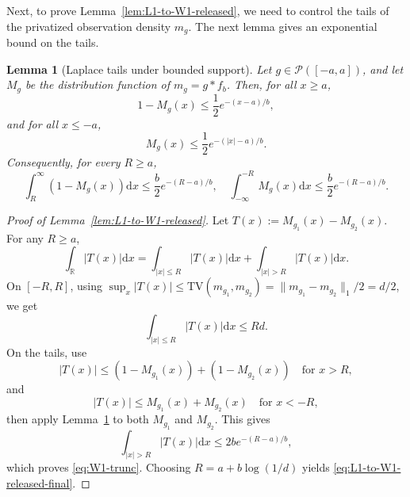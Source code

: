 \documentclass[english, 11pt]{article}
\newcommand{\mrd}{\mathrm{d}}
\theoremstyle{plain}
\newtheorem{lemma}[theorem]{Lemma}
\theoremstyle{definition}
\theoremstyle{remark}
\begin{document}
\begin{appendix}
Next, to prove Lemma~\ref{lem:L1-to-W1-released}, we need to control the tails of the privatized observation density $m_g$. The next lemma gives an exponential bound on the tails.

\begin{lemma}[Laplace tails under bounded support]\label{lem:laplace-tail}
Let $g\in\mathcal P([-a,a])$, and let $M_g$ be the distribution function of $m_g=g*f_b$. Then, for all $x\ge a$,
\begin{equation}\label{eq:right-tail}
1-M_g(x)\le \frac12 e^{-(x-a)/b},
\end{equation}
and for all $x\le -a$,
\begin{equation}\label{eq:left-tail}
M_g(x)\le \frac12 e^{-(|x|-a)/b}.
\end{equation}
Consequently, for every $R\ge a$,
\begin{equation}\label{eq:tail-int}
\int_R^\infty (1-M_g(x))\mrd x \le \frac{b}{2}e^{-(R-a)/b}, \quad \int_{-\infty}^{-R} M_g(x)\mrd x \le \frac{b}{2}e^{-(R-a)/b}.
\end{equation}
\end{lemma}

\restatefromlone*

\begin{proof}[Proof of Lemma~\ref{lem:L1-to-W1-released}]
Let $T(x):=M_{g_1}(x)-M_{g_2}(x)$. For any $R\ge a$,
\begin{equation*}
\int_{\mathbb R}|T(x)|\mrd x = \int_{|x|\le R}|T(x)| \mrd x + \int_{|x|>R}|T(x)| \mrd x.
\end{equation*}
On $[-R,R]$, using $\sup_x |T(x)|\le \mathrm{TV}(m_{g_1},m_{g_2})=\|m_{g_1}-m_{g_2}\|_1/2=d/2$, we get
\begin{equation*}
\int_{|x|\le R}|T(x)|\mrd x \le Rd.
\end{equation*}
On the tails, use
\begin{equation*}
|T(x)|\le (1-M_{g_1}(x))+(1-M_{g_2}(x)) \quad \text{for } x>R,
\end{equation*}
and
\begin{equation*}
|T(x)|\le M_{g_1}(x)+M_{g_2}(x)\quad \text{for } x < -R,
\end{equation*}
then apply Lemma~\ref{lem:laplace-tail} to both $M_{g_1}$ and $M_{g_2}$. This gives
\begin{equation*}
\int_{|x|>R}|T(x)|\mrd x \le 2b e^{-(R-a)/b},
\end{equation*}
which proves \eqref{eq:W1-trunc}. Choosing $R=a+b\log(1/d)$ yields \eqref{eq:L1-to-W1-released-final}.
\end{proof}


\end{appendix}
\end{document}
